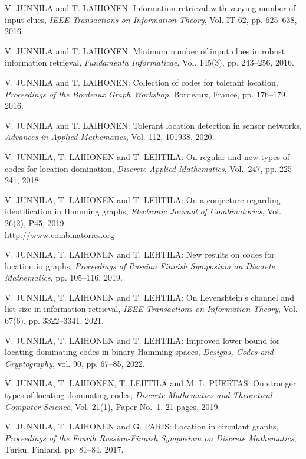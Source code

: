 \begin{thebibliography}{999}
V. JUNNILA and T. LAIHONEN: Information retrieval with varying number of input clues, {\it IEEE Transactions on Information Theory}, Vol. IT-62, pp. 625--638, 2016.

V. JUNNILA and T. LAIHONEN: Minimum number of input clues in robust information retrieval, {\it Fundamenta Informaticae}, Vol. 145(3), pp. 243--256, 2016.

V. JUNNILA and T. LAIHONEN: Collection of codes for tolerant location, {\it Proceedings of the Bordeaux Graph Workshop}, Bordeaux, France, pp. 176--179, 2016.

V. JUNNILA and T. LAIHONEN: Tolerant location detection in sensor networks, {\it Advances in Applied Mathematics}, Vol. 112, 101938, 2020.

V. JUNNILA, T. LAIHONEN and T. LEHTIL\"A: On regular and new types of codes for location-domination, {\it Discrete Applied Mathematics}, Vol.~247, pp. 225--241, 2018.

V. JUNNILA, T. LAIHONEN and T. LEHTIL\"A: On a conjecture regarding identification in Hamming graphs, {\it Electronic Journal of Combinatorics}, Vol. 26(2), P45, 2019.\\
http://www.combinatorics.org

V. JUNNILA, T. LAIHONEN and T. LEHTIL\"A: New results on codes for location in graphs, {\it Proceedings of Russian Finnish Symposium on Discrete Mathematics}, pp. 105--116, 2019.

V. JUNNILA, T. LAIHONEN and T. LEHTIL\"A: On Levenshtein's channel and list size in information retrieval, {\it IEEE Transactions on Information Theory}, Vol. 67(6), pp. 3322--3341, 2021.

V. JUNNILA, T. LAIHONEN and T. LEHTIL\"A: Improved lower bound for locating-dominating codes in binary Hamming spaces, {\it Designs, Codes and Cryptography}, vol. 90, pp. 67--85, 2022.

V. JUNNILA, T. LAIHONEN, T. LEHTIL\"A and M. L. PUERTAS: On stronger types of locating-dominating codes, {\it Discrete Mathematics and Theoretical Computer Science}, Vol. 21(1), Paper No.~1, 21 pages, 2019.

V. JUNNILA, T. LAIHONEN and G. PARIS: Location in circulant graphs, {\it Proceedings of the Fourth Russian-Finnish Symposium on Discrete Mathematics}, Turku, Finland, pp. 81--84, 2017.


\end{thebibliography}
